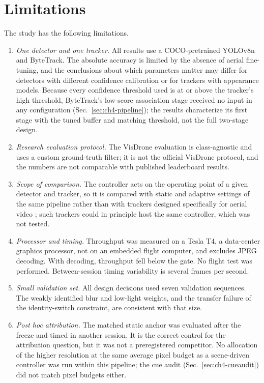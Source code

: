 \section{Limitations}\label{sec:ch4-limits}
The study has the following limitations.
\begin{enumerate}
\item \emph{One detector and one tracker.} All results use a COCO-pretrained YOLOv8n and ByteTrack. The absolute accuracy is limited by the absence of aerial fine-tuning, and the conclusions about which parameters matter may differ for detectors with different confidence calibration or for trackers with appearance models. Because every confidence threshold used is at or above the tracker's high threshold, ByteTrack's low-score association stage received no input in any configuration (Sec.~\ref{sec:ch4-pipeline}); the results characterize its first stage with the tuned buffer and matching threshold, not the full two-stage design.
\item \emph{Research evaluation protocol.} The VisDrone evaluation is class-agnostic and uses a custom ground-truth filter; it is not the official VisDrone protocol, and the numbers are not comparable with published leaderboard results.
\item \emph{Scope of comparison.} The controller acts on the operating point of a given detector and tracker, so it is compared with static and adaptive settings of the same pipeline rather than with trackers designed specifically for aerial video \cite{liu2022uavmot}; such trackers could in principle host the same controller, which was not tested.
\item \emph{Processor and timing.} Throughput was measured on a Tesla T4, a data-center graphics processor, not on an embedded flight computer, and excludes JPEG decoding. With decoding, throughput fell below the gate. No flight test was performed. Between-session timing variability is several frames per second.
\item \emph{Small validation set.} All design decisions used seven validation sequences. The weakly identified blur and low-light weights, and the transfer failure of the identity-switch constraint, are consistent with that size.
\item \emph{Post hoc attribution.} The matched static anchor was evaluated after the freeze and timed in another session. It is the correct control for the attribution question, but it was not a preregistered competitor. No allocation of the higher resolution at the same average pixel budget as a scene-driven controller was run within this pipeline; the cue audit (Sec.~\ref{sec:ch4-cueaudit}) did not match pixel budgets either.

\end{enumerate}
